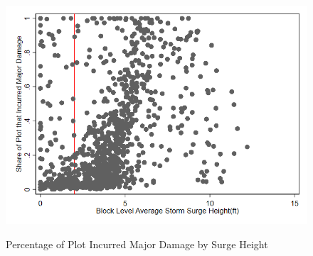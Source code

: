 \documentclass[12pt]{article}
\begin{document}
{{{{{{\begin{figure}[h!]
\caption{Percentage of Plot Incurred Major Damage by Surge Height}
\label{fig:damsurge}
\begin{center}
\includegraphics[scale = 0.41]{Damage/D1 scatter_damage.png}
\label{fig:scatdam}
\end{center}
\end{figure}

}}}}}}
\end{document}
